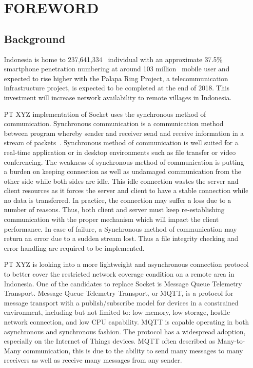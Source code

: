 \chapter{FOREWORD}
\section{Background}
Indonesia is home to 237,641,334~\cite{CensusData} individual with an approximate 37.5\% smartphone penetration numbering at around 103 million~\cite{Statista} mobile user and expected to rise higher with the Palapa Ring Project, a telecommunication infrastructure project, is expected to be completed at the end of 2018\cite{PWCinfra}. This investment will increase network availability to remote villages in Indonesia. 

PT XYZ implementation of Socket uses the synchronous method of communication. Synchronous communication is a communication method between program whereby sender and receiver send and receive information in a stream of packets~\cite{techdifferencesSyncVSAsync}. Synchronous method of communication is well suited for a real-time application or in desktop environments such as file transfer or video conferencing. The weakness of synchronous method of communication is putting a burden on keeping connection as well as undamaged communication from the other side while both sides are idle. This idle connection wastes the server and client resources as it forces the server and client to have a stable connection while no data is transferred. In practice, the connection may suffer a loss due to a number of reasons. Thus, both client and server must keep re-establishing communication with the proper mechanism which will impact the client performance. In case of failure, a Synchronous method of communication may return an error due to a sudden stream lost. Thus a file integrity checking and error handling are required to be implemented.

PT XYZ is looking into a more lightweight and asynchronous connection protocol to better cover the restricted network coverage condition on a remote area in Indonesia. One of the candidates to replace Socket is Message Queue Telemetry Transport. Message Queue Telemetry Transport, or MQTT, is a protocol for message transport with a publish/subscribe model for devices in a constrained environment, including but not limited to: low memory, low storage, hostile network connection, and low CPU capability. MQTT is capable operating in both asynchronous and synchronous fashion. The protocol has a widespread adoption, especially on the Internet of Things devices. MQTT often described as Many-to-Many communication, this is due to the ability to send many messages to many receivers as well as receive many messages from any sender. 

